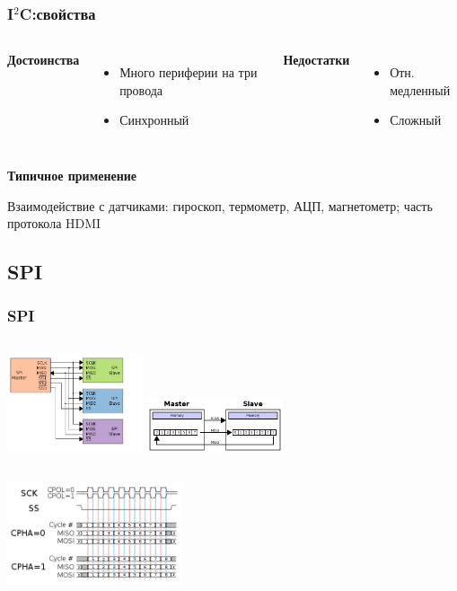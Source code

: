 \begin{frame}
  \frametitle{I$^2$C:свойства}
  \begin{columns}
    \column{4cm}
    \begin{center}
      {\bf\large Достоинства}
    \end{center}
    \begin{itemize}
       \item Много периферии на три провода
       \item Синхронный
    \end{itemize}
    \column{4cm}
    \begin{center}
      {\bf\large Недостатки}
    \end{center}
    \begin{itemize}
       \item Отн. медленный
       \item Сложный
    \end{itemize}
  \end{columns}
  \begin{center}
    {\bf\large Типичное применение}
  \end{center}
  Взаимодействие с датчиками: гироскоп, термометр, АЦП, магнетометр; часть протокола HDMI
\end{frame}
\subsection{SPI}
\begin{frame}
  \frametitle{SPI}
  \begin{columns}
    \column{4cm}
    \includegraphics[width=4cm]{SPI_three_slaves.png}
    \column{4cm}
    \includegraphics[width=4cm]{SPI_8-bit_circular_transfer.png}
  \end{columns}
  \begin{center}
    \includegraphics[height=3cm]{SPI_timing_diagram2.png}
  \end{center}
\end{frame}

